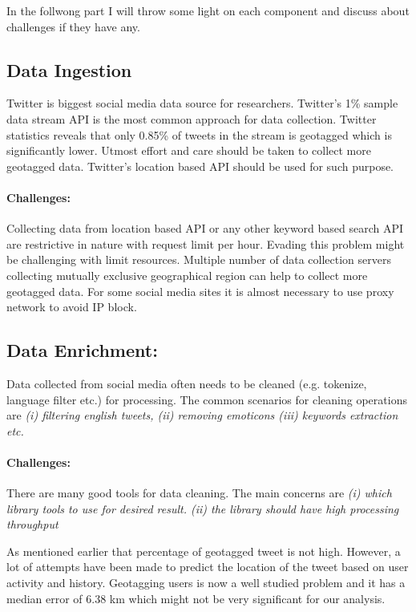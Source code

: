In the follwong part I will throw some light on each component and discuss about challenges if they have any.

\subsection{Data Ingestion}
Twitter is biggest social media data source for researchers. Twitter's 1\% sample data stream API is the most common approach for data collection. Twitter statistics reveals that only 0.85\% of tweets in the stream is geotagged \cite{sloan2013knowing} which is significantly lower. Utmost effort and care should be taken to collect more geotagged data. Twitter's location based API should be used for such purpose.

\paragraph{Challenges:}
Collecting data from location based API or any other keyword based search API are restrictive in nature with request limit per hour.
Evading this problem might be challenging with limit resources. Multiple number of data collection servers collecting mutually exclusive geographical region can help to collect more geotagged data. For some social media sites it is almost necessary to use proxy network to avoid IP block.

\subsection{Data Enrichment:}
Data collected from social media often needs to be cleaned (e.g. tokenize, language filter etc.) for processing. The common scenarios for cleaning operations are {\em(i) filtering english tweets, (ii) removing emoticons (iii) keywords extraction etc. }

\vspace{-2mm}
\paragraph{Challenges:} There are many good tools for data cleaning. The main concerns are {\em(i) which library tools to use for desired result. (ii) the library should have high processing throughput}

As mentioned earlier that percentage of geotagged tweet is not high. However, a lot of attempts have been made to predict the location of the tweet based on user activity and history.  Geotagging users is now a well studied problem and it has a median error of 6.38 km which might not be very significant for our analysis\cite{compton2014geotagging}.

